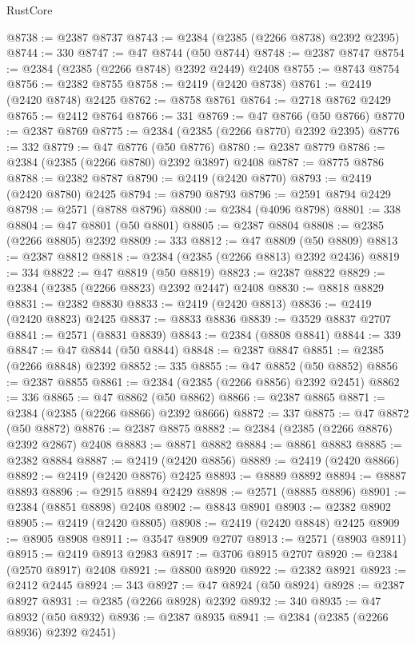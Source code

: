 \begin{lexlean}{RustCore}
\begin{coremodule}
@8738 := @2387 @8737
@8743 := @2384 (@2385 (@2266 @8738) @2392 @2395)
@8744 := 330
@8747 := @47 @8744 (@50 @8744)
@8748 := @2387 @8747
@8754 := @2384 (@2385 (@2266 @8748) @2392 @2449) @2408
@8755 := @8743 @8754
@8756 := @2382 @8755
@8758 := @2419 (@2420 @8738)
@8761 := @2419 (@2420 @8748) @2425
@8762 := @8758 @8761
@8764 := @2718 @8762 @2429
@8765 := @2412 @8764
@8766 := 331
@8769 := @47 @8766 (@50 @8766)
@8770 := @2387 @8769
@8775 := @2384 (@2385 (@2266 @8770) @2392 @2395)
@8776 := 332
@8779 := @47 @8776 (@50 @8776)
@8780 := @2387 @8779
@8786 := @2384 (@2385 (@2266 @8780) @2392 @3897) @2408
@8787 := @8775 @8786
@8788 := @2382 @8787
@8790 := @2419 (@2420 @8770)
@8793 := @2419 (@2420 @8780) @2425
@8794 := @8790 @8793
@8796 := @2591 @8794 @2429
@8798 := @2571 (@8788 @8796)
@8800 := @2384 (@4096 @8798)
@8801 := 338
@8804 := @47 @8801 (@50 @8801)
@8805 := @2387 @8804
@8808 := @2385 (@2266 @8805) @2392
@8809 := 333
@8812 := @47 @8809 (@50 @8809)
@8813 := @2387 @8812
@8818 := @2384 (@2385 (@2266 @8813) @2392 @2436)
@8819 := 334
@8822 := @47 @8819 (@50 @8819)
@8823 := @2387 @8822
@8829 := @2384 (@2385 (@2266 @8823) @2392 @2447) @2408
@8830 := @8818 @8829
@8831 := @2382 @8830
@8833 := @2419 (@2420 @8813)
@8836 := @2419 (@2420 @8823) @2425
@8837 := @8833 @8836
@8839 := @3529 @8837 @2707
@8841 := @2571 (@8831 @8839)
@8843 := @2384 (@8808 @8841)
@8844 := 339
@8847 := @47 @8844 (@50 @8844)
@8848 := @2387 @8847
@8851 := @2385 (@2266 @8848) @2392
@8852 := 335
@8855 := @47 @8852 (@50 @8852)
@8856 := @2387 @8855
@8861 := @2384 (@2385 (@2266 @8856) @2392 @2451)
@8862 := 336
@8865 := @47 @8862 (@50 @8862)
@8866 := @2387 @8865
@8871 := @2384 (@2385 (@2266 @8866) @2392 @8666)
@8872 := 337
@8875 := @47 @8872 (@50 @8872)
@8876 := @2387 @8875
@8882 := @2384 (@2385 (@2266 @8876) @2392 @2867) @2408
@8883 := @8871 @8882
@8884 := @8861 @8883
@8885 := @2382 @8884
@8887 := @2419 (@2420 @8856)
@8889 := @2419 (@2420 @8866)
@8892 := @2419 (@2420 @8876) @2425
@8893 := @8889 @8892
@8894 := @8887 @8893
@8896 := @2915 @8894 @2429
@8898 := @2571 (@8885 @8896)
@8901 := @2384 (@8851 @8898) @2408
@8902 := @8843 @8901
@8903 := @2382 @8902
@8905 := @2419 (@2420 @8805)
@8908 := @2419 (@2420 @8848) @2425
@8909 := @8905 @8908
@8911 := @3547 @8909 @2707
@8913 := @2571 (@8903 @8911)
@8915 := @2419 @8913 @2983
@8917 := @3706 @8915 @2707
@8920 := @2384 (@2570 @8917) @2408
@8921 := @8800 @8920
@8922 := @2382 @8921
@8923 := @2412 @2445
@8924 := 343
@8927 := @47 @8924 (@50 @8924)
@8928 := @2387 @8927
@8931 := @2385 (@2266 @8928) @2392
@8932 := 340
@8935 := @47 @8932 (@50 @8932)
@8936 := @2387 @8935
@8941 := @2384 (@2385 (@2266 @8936) @2392 @2451)

\end{coremodule}
\end{lexlean}
